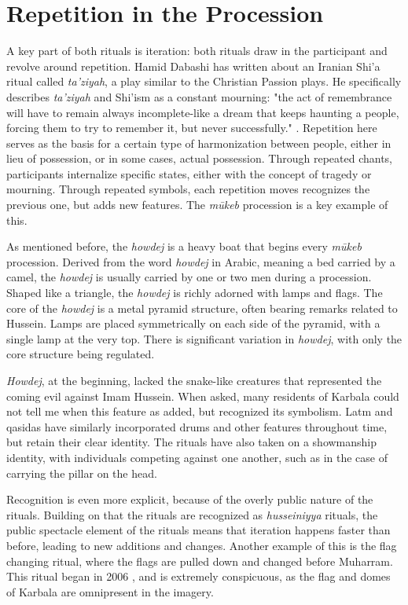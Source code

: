 \section{Repetition in the Procession}
A key part of both rituals is iteration: both rituals draw in the participant and revolve around repetition. Hamid Dabashi has written about an Iranian Shi'a ritual called \emph{ta'ziyah}, a play similar to the Christian Passion plays. He specifically describes \emph{ta'ziyah} and Shi'ism as a constant mourning: "the act of remembrance will have to remain always incomplete-like a dream that keeps haunting a people, forcing them to try to remember it, but never successfully." \cite{dabashi_taziyeh_2005}. Repetition here serves as the basis for a certain type of harmonization between people, either in lieu of possession, or in some cases, actual possession. Through repeated chants, participants internalize specific states, either with the concept of tragedy or mourning. Through repeated symbols, each repetition moves recognizes the previous one, but adds new features. The \emph{mūkeb} procession is a key example of this.

As mentioned before, the \emph{howdej} is a heavy boat that begins every \emph{mūkeb} procession. Derived from the word \emph{howdej} in Arabic, meaning a bed carried by a camel, the \emph{howdej} is usually carried by one or two men during a procession. Shaped like a triangle, the \emph{howdej} is richly adorned with lamps and flags. The core of the \emph{howdej} is a metal pyramid structure, often bearing remarks related to Hussein. Lamps are placed symmetrically on each side of the pyramid, with a single lamp at the very top. There is significant variation in \emph{howdej}, with only the core structure being regulated. 

\emph{Howdej}, at the beginning, lacked the snake-like creatures that represented the coming evil against Imam Hussein. When asked, many residents of Karbala could not tell me when this feature as added, but recognized its symbolism. Latm and qasidas have similarly incorporated drums and other features throughout time, but retain their clear identity. The rituals have also taken on a showmanship identity, with individuals competing against one another, such as in the case of carrying the pillar on the head. 

Recognition is even more explicit, because of the overly public nature of the rituals. Building on that the rituals are recognized as \emph{husseiniyya} rituals, the public spectacle element of the rituals means that iteration happens faster than before, leading to new additions and changes. Another example of this is the flag changing ritual, where the flags are pulled down and changed before Muharram. This ritual began in 2006 \cite{hamdan_development_2012}, and is extremely conspicuous, as the flag and domes of Karbala are omnipresent in the imagery. 

